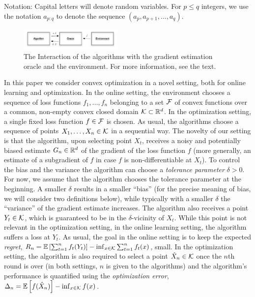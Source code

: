 
Notation: Capital letters will denote random variables.
For $p\le q$ integers, 
 we use the notation $a_{p:q}$ to denote
 the sequence $(a_p,a_{p+1}, \dots, a_{q})$.


\begin{figure}
\begin{center}
\includegraphics[width=0.45\textwidth]{figs/oracle}
\end{center}
\caption{The Interaction of the algorithms with the gradient estimation oracle and the environment. For more information, see the text.}
\label{fig:oracle}
\end{figure}

In this paper we consider convex optimization in a novel setting, both for online learning and optimization. 
In the online setting, the environment chooses a sequence of loss functions $f_1,\dots,f_n$ belonging to a set $\mathcal{F}$ of convex functions over a common, non-empty convex closed domain $\mathcal{K}\subset \mathbb{R}^d$. 
In the optimization setting, a single fixed loss function $f\in \mathcal{F}$ is chosen.
As usual, the algorithms choose a sequence of points $X_1,\dots,X_n\in \mathcal{K}$ in a sequential way. 
The novelty of our setting is that the algorithm, upon selecting point $X_t$, receives 
a noisy and potentially biased estimate $G_n\in \mathbb{R}^d$ 
of the gradient of the loss function $f$ (more generally, an estimate of a subgradient of $f$ in case $f$ is non-differentiable at $X_t$). 
To control the bias and the variance the algorithm can choose a \emph{tolerance parameter} $\delta>0$. 
For now, we assume that the algorithm chooses the tolerance parameter at the beginning. 
A smaller $\delta$ results in a smaller ``bias'' (for the precise meaning of bias, we will consider two definitions below), while typically with a smaller $\delta$ the ``variance'' of the gradient estimate increases.
The algorithm also receives a point $Y_t\in \mathcal{K}$, which is guaranteed to be in the $\delta$-vicinity of $X_t$. While this point is not relevant in the optimization setting, in the online learning setting, the algorithm suffers a loss at $Y_t$.
As usual, the goal in the online setting is to keep the expected \emph{regret}, 
	$R_n =\mathbb{E}\left[ \sum_{t=1}^n f_t(Y_t)\right] - \inf_{x\in \mathcal{K}} \sum_{t=1}^n f_t(x)$,
small.
In the optimization setting, the algorithm is also required to select a point $\hat{X}_n\in \mathcal{K}$ once
the $n$th round is over (in both settings, $n$ is given to the algorithms)
and the algorithm's performance is quantified using the \emph{optimization error}, $\Delta_n = \mathbb{E}\left[f(\hat{X}_n)\right] - \inf_{x\in \mathcal{K}} f(x) $.

